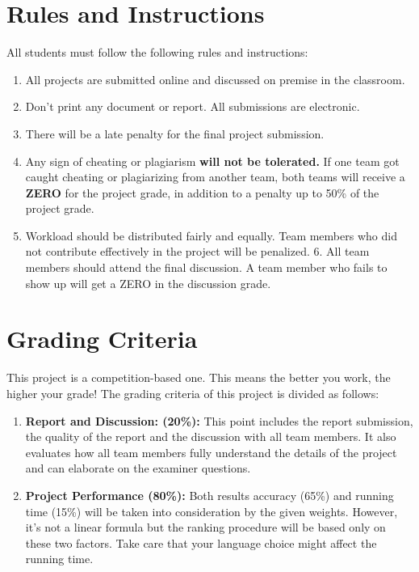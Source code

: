 \documentclass[12pt]{article}
\begin{document}
\section{Rules and Instructions}
All students must follow the following rules and instructions:
\begin{enumerate}
\item All projects are submitted online and discussed on premise in the classroom. 

\item Don’t print any document or report. All submissions are electronic.

\item There will be a late penalty for the final project submission. 

\item Any sign of cheating or plagiarism \textbf{will not be tolerated.} If one team got caught cheating or plagiarizing from another team, both teams will receive a \textbf{ZERO} for the project grade, in addition to a penalty up to 50\% of the project grade.

\item Workload should be distributed fairly and equally. Team members who
did not contribute effectively in the project will be penalized.
6. All team members should attend the final discussion. A team member who
fails to show up will get a ZERO in the discussion grade.

\end{enumerate}

\section{Grading Criteria}
\label{Grading}

This project is a competition-based one. This means the better you work, the higher your grade!
The grading criteria of this project is divided as follows:
\begin{enumerate}
    \item \textbf{Report and Discussion: (20\%):} This point includes the report submission, the quality of the report and the discussion with all team members. It also evaluates how all team members fully understand the details of the project and can elaborate on the examiner questions.
    \item \textbf{Project Performance (80\%):} Both results accuracy (65\%) and running time (15\%) will be taken into consideration by the given weights. However, it’s not a linear formula but the ranking procedure will be based only on these two factors. Take care that your language choice might affect the running time.
\end{enumerate}
\end{document}
